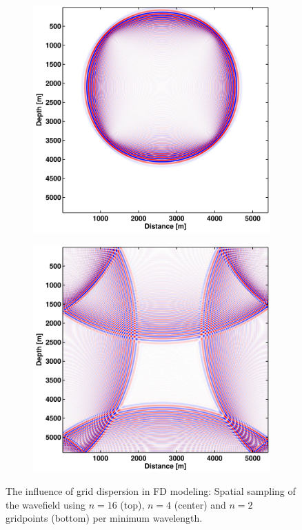 \begin{figure}[ht!]
\begin{subfigure}[b]{0.45\textwidth}
        \caption{}
    \end{subfigure}
    \vfill
    \begin{subfigure}[b]{0.45\textwidth}
        \centering
        \includegraphics[width=\textwidth]{figures/homogenous_grid_n_2_5.pdf}
        \caption{}
    \end{subfigure}
    \hfill
    \begin{subfigure}[b]{0.45\textwidth}
        \centering
        \includegraphics[width=\textwidth]{figures/homogenous_grid_n_2_10.pdf}
        \caption{}
    \end{subfigure}
\caption{\label{grid_disp_pics} The influence of grid dispersion in FD modeling: Spatial sampling of the wavefield using $n=16$ (top), $n=4$ (center) and $n=2$ gridpoints (bottom) per minimum wavelength.}
\label{fig_homo_grid}
\end{figure}

